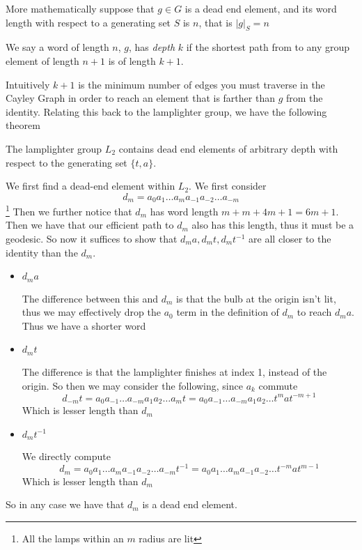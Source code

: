 More mathematically suppose that $g\in G$ is a dead end element, and its word length with respect to a generating set $S$ is $n$, that is $\vert g\vert _S = n$
\begin{definition}[Depth]
    We say a word of length $n$, $g$, has \textit{depth} $k$ if the shortest path from to any group element of length $n+1$ is of length $k+1$.
\end{definition}
Intuitively $k+1$ is the minimum number of edges you must traverse in the Cayley Graph in order to reach an element that is farther than $g$ from the identity. Relating this back to the lamplighter group, we have the following theorem
\begin{theorem}
    The lamplighter group $L_2$ contains dead end elements of arbitrary depth with respect to the generating set $\{t,a\}$.
\end{theorem}
We first find a dead-end element within $L_2$. We first consider
\[d_m = a_0a_1\ldots a_ma_{-1}a_{-2}\ldots a_{-m}\]\footnote{All the lamps within an $m$ radius are lit}
Then we further notice that $d_m$ has word length $m + m + 4m+1=6m+1$. Then we have that our efficient path to $d_m$ also has this length, thus it must be a geodesic. So now it suffices to show that $d_ma,d_mt,d_mt^{-1}$ are all closer to the identity than the $d_m$.
\begin{itemize}
    \item $d_ma$
    
    The difference between this and $d_m$ is that the bulb at the origin isn't lit, thus we may effectively drop the $a_0$ term in the definition of $d_m$ to reach $d_ma$. Thus we have a shorter word
    \item $d_mt$ 
    
    The difference is that the lamplighter finishes at index 1, instead of the origin. So then we may consider the following, since $a_k$ commute
    \[d_{-m}t= a_0a_{-1}\ldots a_{-m}a_{1}a_{2}\ldots a_{m}t = a_0a_{-1}\ldots a_{-m}a_{1}a_{2}\ldots t^mat^{-m+1}\]
    Which is lesser length than $d_m$
    \item $d_mt^{-1}$
    
    We directly compute 
    \[d_m = a_0a_1\ldots a_ma_{-1}a_{-2}\ldots a_{-m}t^{-1}= a_0a_1\ldots a_ma_{-1}a_{-2}\ldots t^{-m}at^{m-1}\]
    Which is lesser length than $d_m$
\end{itemize}
So in any case we have that $d_m$ is a dead end element.

